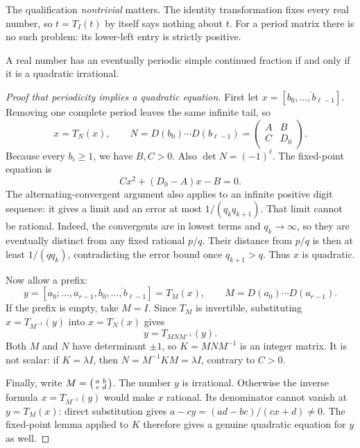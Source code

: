 \begin{warningbox}
The qualification \emph{nontrivial} matters. The identity transformation
fixes every real number, so $t=T_I(t)$ by itself says nothing about $t$.
For a period matrix there is no such problem: its lower-left entry is
strictly positive.
\end{warningbox}

\begin{theorem}[Lagrange]
\label{thm:lagrange-periodicity}
A real number has an eventually periodic simple continued fraction if and
only if it is a quadratic irrational.
\end{theorem}

\begin{proof}[Proof that periodicity implies a quadratic equation]
First let $x=[\overline{b_0,\ldots,b_{\ell-1}}]$. Removing one complete
period leaves the same infinite tail, so
\[
 x=T_N(x),\qquad
 N=D(b_0)\cdots D(b_{\ell-1})
   =\begin{pmatrix}A&B\\C&D_0\end{pmatrix}.
\]
Because every $b_i\ge1$, we have $B,C>0$. Also
$\det N=(-1)^\ell$. The fixed-point equation is
\[
 Cx^2+(D_0-A)x-B=0.
\]
The alternating-convergent argument also applies to an infinite
positive digit sequence: it gives a limit and an error at most
$1/(q_kq_{k+1})$. That limit cannot be rational. Indeed, the
convergents are in lowest terms and $q_k\to\infty$, so they are
eventually distinct from any fixed rational $p/q$. Their distance
from $p/q$ is then at least $1/(q q_k)$, contradicting the error
bound once $q_{k+1}>q$. Thus $x$ is quadratic.

Now allow a prefix:
\[
 y=[a_0;\ldots,a_{r-1},\overline{b_0,\ldots,b_{\ell-1}}]
   =T_M(x),\qquad M=D(a_0)\cdots D(a_{r-1}).
\]
If the prefix is empty, take $M=I$. Since $T_M$ is invertible,
substituting $x=T_{M^{-1}}(y)$ into $x=T_N(x)$ gives
\begin{equation}\label{eq:prefix-conjugation}
 \boxed{\ y=T_{MNM^{-1}}(y).\ }
\end{equation}
Both $M$ and $N$ have determinant $\pm1$, so $K=MNM^{-1}$ is an
integer matrix. It is not scalar: if $K=\lambda I$, then
$N=M^{-1}KM=\lambda I$, contrary to $C>0$.

Finally, write $M=\begin{psmallmatrix}a&b\\c&d\end{psmallmatrix}$.
The number $y$ is irrational. Otherwise the inverse formula
$x=T_{M^{-1}}(y)$ would make $x$ rational. Its denominator cannot vanish
at $y=T_M(x)$: direct substitution gives
$a-cy=(ad-bc)/(cx+d)\ne0$.
The fixed-point lemma applied to $K$ therefore gives a genuine quadratic
equation for $y$ as well.
\end{proof}

